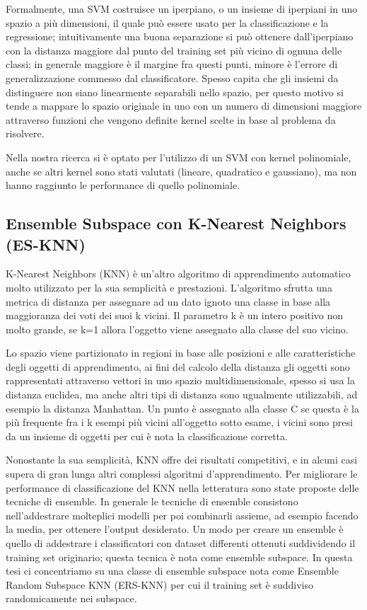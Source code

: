 Formalmente, una SVM costruisce un iperpiano, o un insieme di iperpiani in uno spazio a più dimensioni, il quale può essere usato per la classificazione e la regressione; intuitivamente una buona separazione si può ottenere dall'iperpiano con la distanza maggiore dal punto del training set più vicino di ognuna delle classi; in generale maggiore è il margine fra questi punti, minore è l'errore di generalizzazione commesso dal classificatore. Spesso capita che gli insiemi da distinguere non siano linearmente separabili nello spazio, per questo motivo si tende a mappare lo spazio originale in uno con un numero di dimensioni maggiore attraverso funzioni che vengono definite kernel scelte in base al problema da risolvere.

Nella nostra ricerca si è optato per l'utilizzo di un SVM con kernel polinomiale, anche se altri kernel sono stati valutati (lineare, quadratico e gaussiano), ma non hanno raggiunto le performance di quello polinomiale.

\subsection{Ensemble Subspace con K-Nearest Neighbors (ES-KNN)}
\label{ssec:knn}

K-Nearest Neighbors (KNN) è un'altro algoritmo di apprendimento automatico molto utilizzato per la sua semplicità e prestazioni. L'algoritmo sfrutta una metrica di distanza per assegnare ad un dato ignoto una classe in base alla maggioranza dei voti dei suoi k vicini. Il parametro k è un intero positivo non molto grande, se k=1 allora l'oggetto viene assegnato alla classe del suo vicino. 

Lo spazio viene partizionato in regioni in base alle posizioni e alle caratteristiche degli oggetti di apprendimento, ai fini del calcolo della distanza gli oggetti sono rappresentati attraverso vettori in uno spazio multidimensionale, spesso si usa la distanza euclidea, ma anche altri tipi di distanza sono ugualmente utilizzabili, ad esempio la distanza Manhattan. 
Un punto è assegnato alla classe C se questa è la più frequente fra i k esempi più vicini all'oggetto sotto esame, i vicini sono presi da un insieme di oggetti per cui è nota la classificazione corretta. 

Nonostante la sua semplicità, KNN offre dei risultati competitivi, e in alcuni casi supera di gran lunga altri complessi algoritmi d'apprendimento. Per migliorare le performance di classificazione del KNN nella letteratura sono state proposte delle tecniche di ensemble. In generale le tecniche di ensemble consistono nell'addestrare molteplici modelli per poi combinarli assieme, ad esempio facendo la media, per ottenere l'output desiderato. Un modo per creare un ensemble è quello di addestrare i classificatori con dataset differenti ottenuti suddividendo il training set originario; 
questa tecnica è nota come ensemble subspace. In questa tesi ci concentriamo su una classe di ensemble subspace nota come Ensemble Random Subspace KNN (ERS-KNN) per cui il training set è suddiviso randomicamente nei subspace.

